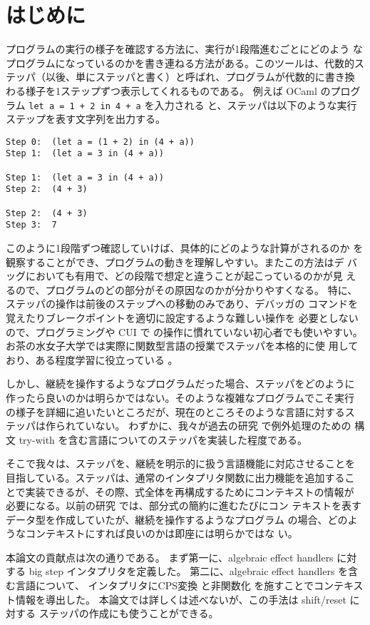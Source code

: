 \section{はじめに}

プログラムの実行の様子を確認する方法に、実行が1段階進むごとにどのよう
なプログラムになっているのかを書き連ねる方法がある。このツールは、代数的ス
テッパ（以後、単にステッパと書く）と呼ばれ、プログラムが代数的に書き換
わる様子を1ステップずつ表示してくれるものである。
例えば OCaml のプログラム \texttt{let a = 1 + 2 in 4 + a} を入力される
と、ステッパは以下のような実行ステップを表す文字列を出力する。

\begin{verbatim}
Step 0:  (let a = (1 + 2) in (4 + a))
Step 1:  (let a = 3 in (4 + a))

Step 1:  (let a = 3 in (4 + a))
Step 2:  (4 + 3)

Step 2:  (4 + 3)
Step 3:  7
\end{verbatim}

このように1段階ずつ確認していけば、具体的にどのような計算がされるのか
を観察することができ、プログラムの動きを理解しやすい。またこの方法はデ
バッグにおいても有用で、どの段階で想定と違うことが起こっているのかが見
えるので、プログラムのどの部分がその原因なのかが分かりやすくなる。
特に、ステッパの操作は前後のステップへの移動のみであり、デバッガの
コマンドを覚えたりブレークポイントを適切に設定するような難しい操作を
必要としないので、プログラミングや CUI で の操作に慣れていない初心者でも使いやすい。
お茶の水女子大学では実際に関数型言語の授業でステッパを本格的に使
用しており、ある程度学習に役立っている \cite{FCA19}。

しかし、継続を操作するようなプログラムだった場合、ステッパをどのように
作ったら良いのかは明らかではない。そのような複雑なプログラムでこそ実行
の様子を詳細に追いたいところだが、現在のところそのような言語に対するス
テッパは作られていない。
わずかに、我々が過去の研究 \cite{FCA19} で例外処理のための
構文 try-with を含む言語についてのステッパを実装した程度である。

そこで我々は、ステッパを、継続を明示的に扱う言語機能に対応させることを
目指している。ステッパは、通常のインタプリタ関数に出力機能を追加するこ
とで実装できるが、その際、式全体を再構成するためにコンテキストの情報が
必要になる。以前の研究 \cite{FCA19} では、部分式の簡約に進むたびにコン
テキストを表すデータ型を作成していたが、継続を操作するようなプログラム
の場合、どのようなコンテキストにすれば良いのかは即座には明らかではな
い。

本論文の貢献点は次の通りである。
まず第一に、algebraic effect handlers に対する big step インタプリタを定義した。
第二に、algebraic effect handlers を含む言語について、
インタプリタにCPS変換 \cite{PLOTKIN1975125}と非関数化
\cite{Reynolds1998}を施すことでコンテキスト情報を導出した。
本論文では詳しくは述べないが、この手法は shift/reset に対する
ステッパの作成にも使うことができる。

